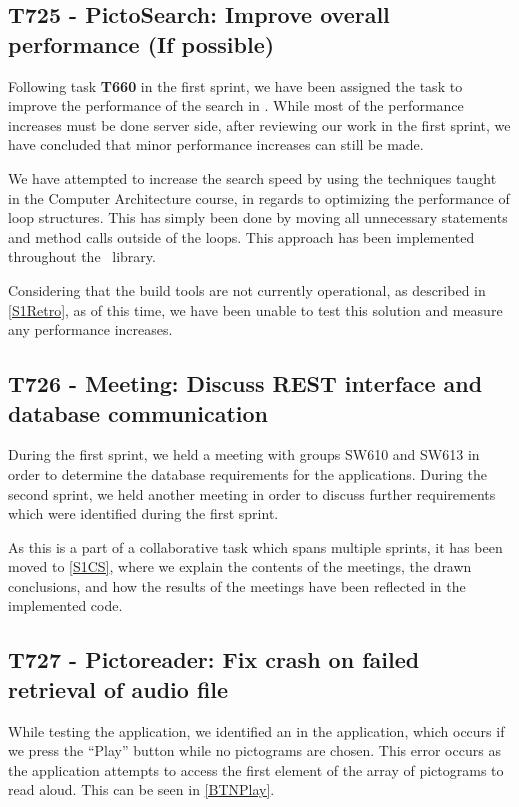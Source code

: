\subsection{T725 - PictoSearch: Improve overall performance (If possible)}
Following task \textbf{T660} in the first sprint, we have been assigned the task
to improve the performance of the search in \plib. While most
of the performance increases must be done server side, after reviewing our work
in the first sprint, we have concluded that minor performance increases can
still be made.\nl

We have attempted to increase the search speed by using the techniques taught in
the Computer Architecture course, in regards to optimizing the performance of
loop structures. This has simply been done by moving all unnecessary statements
and method calls outside of the loops. This approach has been implemented
throughout the \plib\ library.\nl

Considering that the build tools are not currently operational, as described in
\autoref{S1Retro}, as of this time, we have been unable to test this solution
and measure any performance increases.

\subsection{T726 - Meeting: Discuss REST interface and database communication}
During the first sprint, we held a meeting with groups SW610 and SW613 in order
to determine the database requirements for the applications. During the second
sprint, we held another meeting in order to discuss further requirements which
were identified during the first sprint.\nl

As this is a part of a collaborative task which spans multiple sprints, it has
been moved to \autoref{S1CS}, where we explain the contents of the meetings, the drawn
conclusions, and how the results of the meetings have been reflected in the
implemented code.

\subsection{T727 - Pictoreader: Fix crash on failed retrieval of audio file}
\label{T727}
While testing the  application, we identified an
 in the  application, which
occurs if we press the ``Play'' button while no pictograms are chosen. This
error occurs as the application attempts to access the first element of the
array of pictograms to read aloud. This can be seen in \autoref{BTNPlay}.\nl

